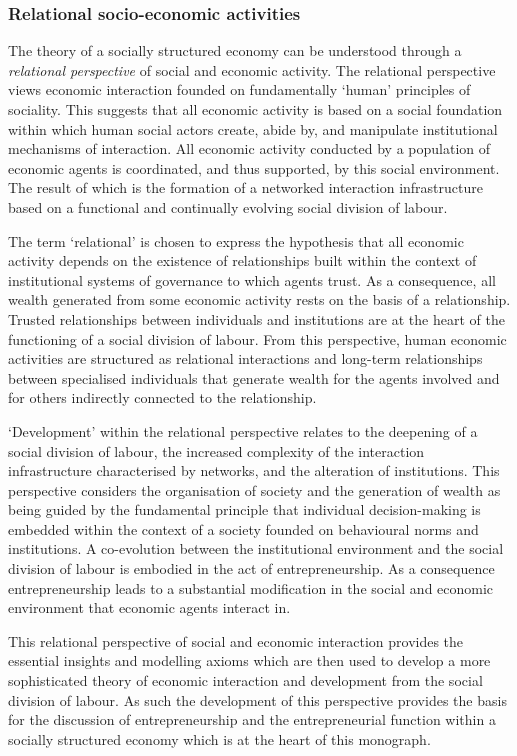 \subsubsection{Relational socio-economic activities}

The theory of a socially structured economy can be understood through a \emph{relational perspective} of social and economic activity. The relational perspective views economic interaction founded on fundamentally `human' principles of sociality. This suggests that all economic activity is based on a social foundation within which human social actors create, abide by, and manipulate institutional mechanisms of interaction. All economic activity conducted by a population of economic agents is coordinated, and thus supported, by this social environment. The result of which is the formation of a networked interaction infrastructure based on a functional and continually evolving social division of labour.

The term `relational' is chosen to express the hypothesis that all economic activity depends on the existence of relationships built within the context of institutional systems of governance to which agents trust. As a consequence, all wealth generated from some economic activity rests on the basis of a relationship. Trusted relationships between individuals and institutions are at the heart of the functioning of a social division of labour. From this perspective, human economic activities are structured as relational interactions and long-term relationships between specialised individuals that generate wealth for the agents involved and for others indirectly connected to the relationship. 

`Development' within the relational perspective relates to the deepening of a social division of labour, the increased complexity of the interaction infrastructure characterised by networks, and the alteration of institutions. This perspective considers the organisation of society and the generation of wealth as being guided by the fundamental principle that individual decision-making is embedded within the context of a society founded on behavioural norms and institutions. A co-evolution between the institutional environment and the social division of labour is embodied in the act of entrepreneurship. As a consequence entrepreneurship leads to a substantial modification in the social and economic environment that economic agents interact in.

This relational perspective of social and economic interaction provides the essential insights and modelling axioms which are then used to develop a more sophisticated theory of economic interaction and development from the social division of labour. As such the development of this perspective provides the basis for the discussion of entrepreneurship and the entrepreneurial function within a socially structured economy which is at the heart of this monograph.


